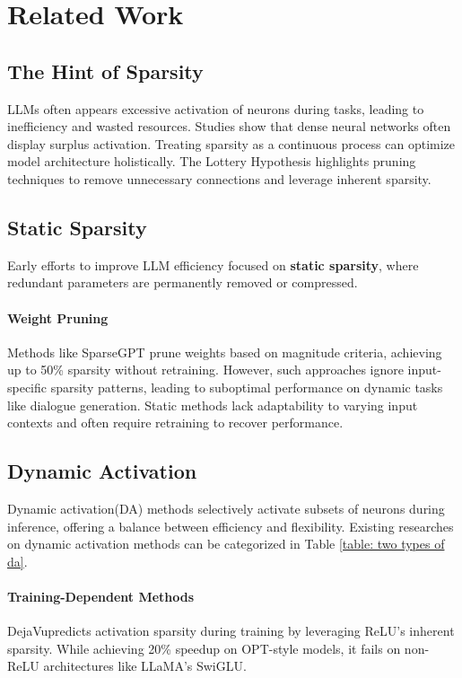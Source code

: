 \section{Related Work}
\label{app: related work}
\subsection{The Hint of Sparsity}
LLMs often appears excessive activation of neurons during tasks, leading to inefficiency and wasted resources\cite{bommasani2022opportunitiesrisksfoundationmodels, yuan2024llminferenceunveiledsurvey}. Studies\cite{liu2023modelbasedcontrolsparseneural} show that dense neural networks often display surplus activation. Treating sparsity as a continuous process can optimize model architecture holistically. The Lottery Hypothesis\cite{frankle2019lotterytickethypothesisfinding, malach2020provinglotterytickethypothesis} highlights pruning techniques to remove unnecessary connections and leverage inherent sparsity.

\subsection{Static Sparsity}
Early efforts to improve LLM efficiency focused on \textbf{static sparsity}, where redundant parameters are permanently removed or compressed.

\paragraph{Weight Pruning} Methods like SparseGPT\cite{frantar2023sparsegptmassivelanguagemodels} prune weights based on magnitude criteria, achieving up to 50\% sparsity without retraining. However, such approaches ignore input-specific sparsity patterns, leading to suboptimal performance on dynamic tasks like dialogue generation. Static methods lack adaptability to varying input contexts and often require retraining to recover performance.  

\subsection{Dynamic Activation}
Dynamic activation(DA) methods selectively activate subsets of neurons during inference, offering a balance between efficiency and flexibility. Existing researches on dynamic activation methods can be categorized in Table \ref{table: two types of da}.

\paragraph{Training-Dependent Methods}
DejaVu\cite{liu2023dejavucontextualsparsity}predicts activation sparsity during training by leveraging ReLU’s inherent sparsity. While achieving 20\% speedup on OPT-style models, it fails on non-ReLU architectures like LLaMA’s SwiGLU.

